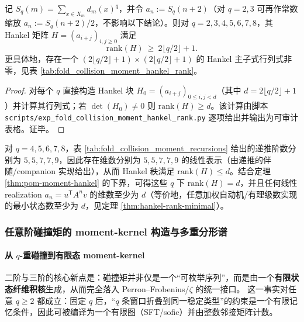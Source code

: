 \begin{theorem}\label{thm:pom-moment-hankel}
记 \(S_q(m)=\sum_{x\in X_m} d_m(x)^q\)，并令 \(a_n:=S_q(n+2)\)（对 \(q=2,3\) 可再作常数缩放 \(a_n:=S_q(n+2)/2\)，不影响以下结论）。则对 \(q=2,3,4,5,6,7,8\)，其 Hankel 矩阵 \(H=(a_{i+j})_{i,j\ge 0}\) 满足
\[
\mathrm{rank}(H)\ \ge\ 2\lfloor q/2\rfloor+1.
\]
更具体地，存在一个 \((2\lfloor q/2\rfloor+1)\times(2\lfloor q/2\rfloor+1)\) 的 Hankel 主子式行列式非零，见表 \ref{tab:fold_collision_moment_hankel_rank}。
\end{theorem}
\begin{proof}
对每个 \(q\) 直接构造 Hankel 块 \(H_0=(a_{i+j})_{0\le i,j<d}\)（其中 \(d=2\lfloor q/2\rfloor+1\)）并计算其行列式；若 \(\det(H_0)\neq 0\) 则 \(\mathrm{rank}(H)\ge d\)。该计算由脚本 \texttt{scripts/exp\_fold\_collision\_moment\_hankel\_rank.py} 逐项给出并输出为可审计表格。{证毕。}
\end{proof}

\begin{corollary}\label{cor:pom-moment-minreal}
对 \(q=4,5,6,7,8\)，表 \ref{tab:fold_collision_moment_recursions} 给出的递推阶数分别为 \(5,5,7,7,9\)，因此存在维数分别为 \(5,5,7,7,9\) 的线性表示（由递推的伴随/companion 实现给出），从而 Hankel 秩满足 \(\mathrm{rank}(H)\le d\)。结合定理 \ref{thm:pom-moment-hankel} 的下界，可得这些 \(q\) 下 \(\mathrm{rank}(H)=d\)，并且任何线性 realization \(a_n=u^{\mathsf T}A^n v\) 的维数至少为 \(d\)（等价地，任意加权自动机/有理级数实现的最小状态数至少为 \(d\)，见定理 \ref{thm:hankel-rank-minimal}）。
\end{corollary}



\subsubsection{任意阶碰撞矩的 moment-kernel 构造与多重分形谱}\label{subsec:pom-moment-general}

\paragraph{从 \texorpdfstring{$q$}{q}-重碰撞到有限态 moment-kernel}
二阶与三阶的核心新点是：碰撞矩并非仅是一个“可枚举序列”，而是由一个\textbf{有限状态纤维积核}生成，从而完全落入 Perron--Frobenius/\(\zeta\) 的统一接口。
这一事实对任意 \(q\ge 2\) 都成立：固定 \(q\) 后，“\(q\) 条窗口折叠到同一稳定类型”的约束是一个有限记忆条件，因此可被编译为一个有限图（SFT/sofic）并由整数邻接矩阵计数。

